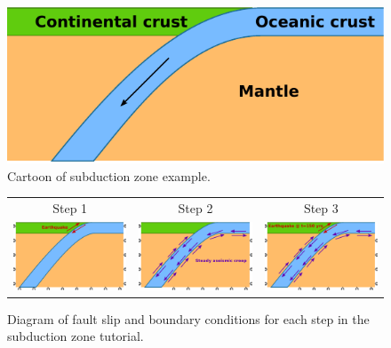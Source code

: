 \begin{figure}
  \includegraphics{examples/figs/subduction_cartoon_general}
  \caption{Cartoon of subduction zone example.}
  \label{fig:tutorial:subduction:overview}
\end{figure}

\begin{figure}
  \begin{tabular}{ccc}
    Step 1 & Step 2 & Step 3 \\
    \includegraphics[width=2in]{examples/figs/subduction_step01} &
    \includegraphics[width=2in]{examples/figs/subduction_step02} & 
    \includegraphics[width=2in]{examples/figs/subduction_step03} \\
  \end{tabular}
  \caption{Diagram of fault slip and boundary conditions for each step in the
    subduction zone tutorial.}
  \label{fig:tutorial:subduction:steps}
\end{figure}


